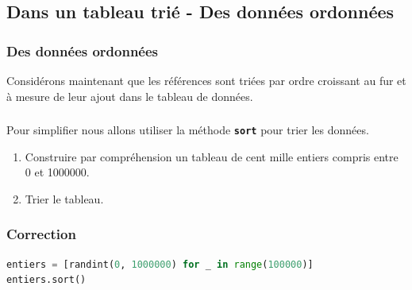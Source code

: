 \documentclass[svgnames,11pt]{beamer}
\begin{document}
\subsection{Dans un tableau trié - Des données ordonnées}
\begin{frame}
    \frametitle{Des données ordonnées}
    Considérons maintenant que les références sont triées par ordre croissant au fur et à mesure de leur ajout dans le tableau de données.
\begin{center}
\end{center}

\end{frame}
\begin{frame}
    \frametitle{}

    \begin{activite}
        Pour simplifier nous allons utiliser la méthode \textbf{\texttt{sort}} pour trier les données.
        \begin{enumerate}
            \item Construire par compréhension un tableau de cent mille entiers compris entre 0 et 1000000.
            \item Trier le tableau.
        \end{enumerate}
        \end{activite}

\end{frame}
\begin{frame}[fragile]
    \frametitle{Correction}

    \begin{center}
    \begin{lstlisting}[language=Python , basicstyle=\ttfamily\small, xleftmargin=0.2em, xrightmargin=-1.8em]
entiers = [randint(0, 1000000) for _ in range(100000)]
entiers.sort()
\end{lstlisting}
    \label{CODE}
    \end{center}

\end{frame}
\end{document}
